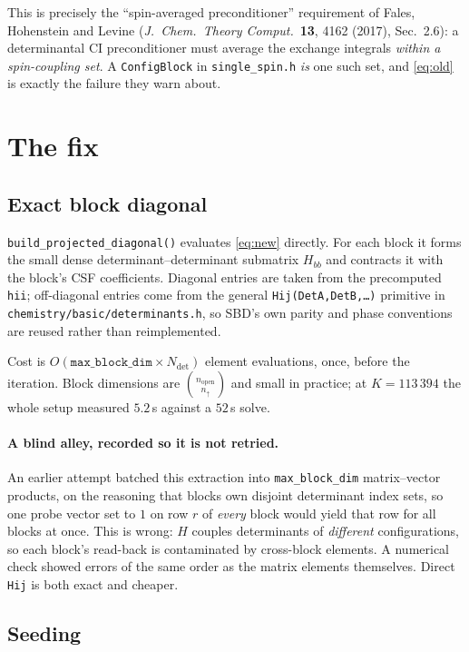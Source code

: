 \documentclass[11pt,a4paper]{article}
\newcommand{\code}[1]{\texttt{\small #1}}
\begin{document}
\medskip\noindent
This is precisely the ``spin-averaged preconditioner'' requirement of Fales,
Hohenstein and Levine (\emph{J.\ Chem.\ Theory Comput.}\ \textbf{13}, 4162
(2017), Sec.~2.6): a determinantal CI preconditioner must average the exchange
integrals \emph{within a spin-coupling set}. A \code{ConfigBlock} in
\code{single\_spin.h} \emph{is} one such set, and \eqref{eq:old} is exactly the
failure they warn about.

\section{The fix}

\subsection*{Exact block diagonal}

\code{build\_projected\_diagonal()} evaluates \eqref{eq:new} directly. For each
block it forms the small dense determinant--determinant submatrix $H_{bb}$ and
contracts it with the block's CSF coefficients. Diagonal entries are taken
from the precomputed \code{hii}; off-diagonal entries come from the general
\code{Hij(DetA,DetB,\dots)} primitive in
\code{chemistry/basic/determinants.h}, so SBD's own parity and phase
conventions are reused rather than reimplemented.

Cost is $O(\texttt{max\_block\_dim}\times N_{\text{det}})$ element
evaluations, once, before the iteration. Block dimensions are
$\binom{n_{\text{open}}}{n_{\uparrow}}$ and small in practice; at
$K=113\,394$ the whole setup measured $5.2\,$s against a $52\,$s solve.

\paragraph{A blind alley, recorded so it is not retried.}
An earlier attempt batched this extraction into \code{max\_block\_dim}
matrix--vector products, on the reasoning that blocks own disjoint determinant
index sets, so one probe vector set to $1$ on row $r$ of \emph{every} block
would yield that row for all blocks at once. This is wrong: $H$ couples
determinants of \emph{different} configurations, so each block's read-back is
contaminated by cross-block elements. A numerical check showed errors of the
same order as the matrix elements themselves. Direct \code{Hij} is both exact
and cheaper.

\subsection*{Seeding}
\end{document}
